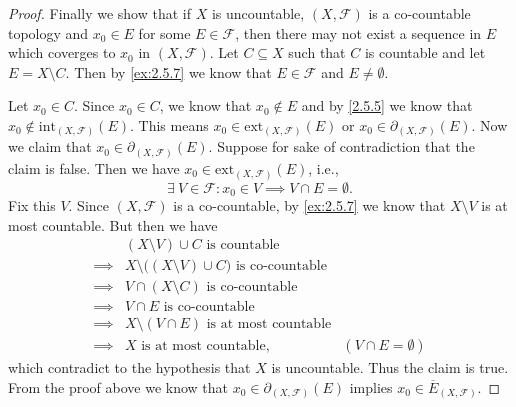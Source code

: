 \begin{proof}
  Finally we show that if \(X\) is uncountable, \((X, \mathcal{F})\) is a co-countable topology and \(x_0 \in E\) for some \(E \in \mathcal{F}\), then there may not exist a sequence in \(E\) which coverges to \(x_0\) in \((X, \mathcal{F})\).
  Let \(C \subseteq X\) such that \(C\) is countable and let \(E = X \setminus C\).
  Then by \cref{ex:2.5.7} we know that \(E \in \mathcal{F}\) and \(E \neq \emptyset\).

  Let \(x_0 \in C\).
  Since \(x_0 \in C\), we know that \(x_0 \notin E\) and by \cref{2.5.5} we know that \(x_0 \notin \text{int}_{(X, \mathcal{F})}(E)\).
  This means \(x_0 \in \text{ext}_{(X, \mathcal{F})}(E)\) or \(x_0 \in \partial_{(X, \mathcal{F})}(E)\).
  Now we claim that \(x_0 \in \partial_{(X, \mathcal{F})}(E)\).
  Suppose for sake of contradiction that the claim is false.
  Then we have \(x_0 \in \text{ext}_{(X, \mathcal{F})}(E)\), i.e.,
  \[
    \exists\ V \in \mathcal{F} : x_0 \in V \implies V \cap E = \emptyset.
  \]
  Fix this \(V\).
  Since \((X, \mathcal{F})\) is a co-countable, by \cref{ex:2.5.7} we know that \(X \setminus V\) is at most countable.
  But then we have
  \begin{align*}
             & (X \setminus V) \cup C \text{ is countable}                                                   \\
    \implies & X \setminus \big((X \setminus V) \cup C\big) \text{ is co-countable}                          \\
    \implies & V \cap (X \setminus C) \text{ is co-countable}                                                \\
    \implies & V \cap E \text{ is co-countable}                                                              \\
    \implies & X \setminus (V \cap E) \text{ is at most countable}                                           \\
    \implies & X \text{ is at most countable},                                      & (V \cap E = \emptyset)
  \end{align*}
  which contradict to the hypothesis that \(X\) is uncountable.
  Thus the claim is true.
  From the proof above we know that \(x_0 \in \partial_{(X, \mathcal{F})}(E)\) implies \(x_0 \in \overline{E}_{(X, \mathcal{F})}\).


\end{proof}
